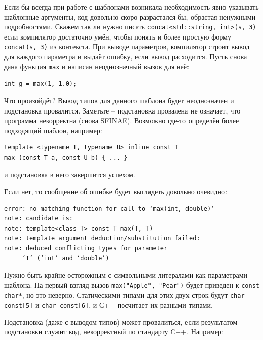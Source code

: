 \documentclass[a4paper,12pt,oneside]{article}
\begin{document}
Если бы всегда при работе с шаблонами возникала необходимость явно указывать шаблонные аргументы, код довольно скоро разрастался бы, обрастая ненужными подробностями. Скажем так ли нужно писать \lstinline!concat<std::string, int>(s, 3)! если компилятор достаточно умён, чтобы понять и более простую форму \lstinline!concat(s, 3)! из контекста. При выводе параметров, компилятор строит вывод для каждого параметра и выдаёт ошибку, если вывод расходится. Пусть снова дана функция \lstinline!max! и написан неоднозначный вызов для неё:



\begin{lstlisting}
int g = max(1, 1.0);
\end{lstlisting}

Что произойдёт? Вывод типов для данного шаблона будет неоднозначен и подстановка провалится. Заметьте -- подстановка провалена не означает, что программа некорректна (снова SFINAE). Возможно где-то определён более подходящий шаблон, например:

\begin{lstlisting}
template <typename T, typename U> inline const T 
max (const T a, const U b) { ... }
\end{lstlisting}

и подстановка в него завершится успехом.

Если нет, то сообщение об ошибке будет выглядеть довольно очевидно:

\begin{verbatim}
error: no matching function for call to ‘max(int, double)’
note: candidate is:
note: template<class T> const T max(T, T)
note: template argument deduction/substitution failed:
note: deduced conflicting types for parameter 
     ‘T’ (‘int’ and ‘double’)
\end{verbatim}

Нужно быть крайне осторожным с символьными литералами как параметрами шаблона. На первый взгляд вызов \lstinline!max("Apple", "Pear")! будет приведен к \lstinline!const char*!, но это неверно. Статическими типами для этих двух строк будут \lstinline!char const[5]! и \lstinline!char const[6]!, и С++ посчитает их разными типами.

Подстановка (даже с выводом типов) может провалиться, если результатом подстановки служит код, некорректный по стандарту C++. Например:


\end{document}
